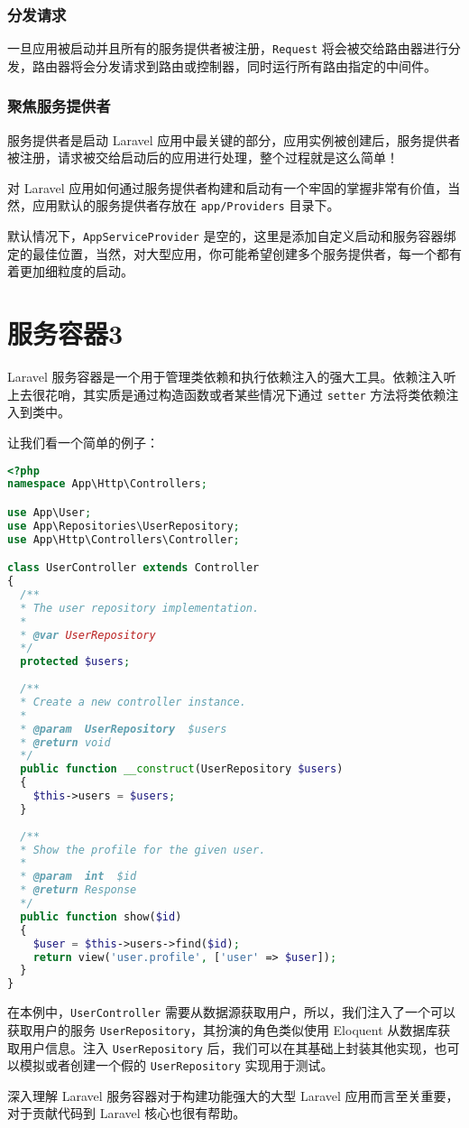 \documentclass{progartcn}
\begin{document}
\subsubsection{分发请求}

一旦应用被启动并且所有的服务提供者被注册，\verb|Request| 将会被交给路由器进行分发，路由器将会分发请求到路由或控制器，同时运行所有路由指定的中间件。

\subsubsection{聚焦服务提供者}

服务提供者是启动 Laravel 应用中最关键的部分，应用实例被创建后，服务提供者被注册，请求被交给启动后的应用进行处理，整个过程就是这么简单！

对 Laravel 应用如何通过服务提供者构建和启动有一个牢固的掌握非常有价值，当然，应用默认的服务提供者存放在 \verb|app/Providers| 目录下。

默认情况下，\verb|AppServiceProvider| 是空的，这里是添加自定义启动和服务容器绑定的最佳位置，当然，对大型应用，你可能希望创建多个服务提供者，每一个都有着更加细粒度的启动。

\section{服务容器3}

Laravel 服务容器是一个用于管理类依赖和执行依赖注入的强大工具。依赖注入听上去很花哨，其实质是通过构造函数或者某些情况下通过 \verb|setter| 方法将类依赖注入到类中。

让我们看一个简单的例子：

\begin{lstlisting}[language=PHP,caption={PHP 代码样例}]
<?php
namespace App\Http\Controllers;

use App\User;
use App\Repositories\UserRepository;
use App\Http\Controllers\Controller;

class UserController extends Controller
{
  /**
  * The user repository implementation.
  *
  * @var UserRepository
  */
  protected $users;
  
  /**
  * Create a new controller instance.
  * 
  * @param  UserRepository  $users
  * @return void
  */
  public function __construct(UserRepository $users)
  {
    $this->users = $users;
  }
  
  /**
  * Show the profile for the given user.
  *
  * @param  int  $id
  * @return Response
  */
  public function show($id)
  {
    $user = $this->users->find($id);
    return view('user.profile', ['user' => $user]);
  }
}
\end{lstlisting}

在本例中，\verb|UserController| 需要从数据源获取用户，所以，我们注入了一个可以获取用户的服务 \verb|UserRepository|，其扮演的角色类似使用 Eloquent 从数据库获取用户信息。注入 \verb|UserRepository| 后，我们可以在其基础上封装其他实现，也可以模拟或者创建一个假的 \verb|UserRepository| 实现用于测试。

深入理解 Laravel 服务容器对于构建功能强大的大型 Laravel 应用而言至关重要，对于贡献代码到 Laravel 核心也很有帮助。

\end{document}
